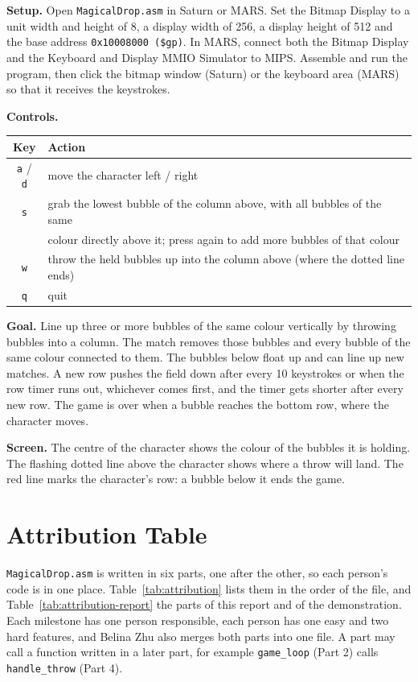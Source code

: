 \documentclass[11pt]{article}
\newcommand{\code}[1]{\texttt{#1}}
\begin{document}
\textbf{Setup.} Open \code{MagicalDrop.asm} in Saturn or MARS. Set the Bitmap
Display to a unit width and height of 8, a display width of 256, a display
height of 512 and the base address \code{0x10008000 (\$gp)}. In MARS, connect
both the Bitmap Display and the Keyboard and Display MMIO Simulator to MIPS.
Assemble and run the program, then click the bitmap window (Saturn) or the
keyboard area (MARS) so that it receives the keystrokes.

\textbf{Controls.}

\begin{center}
\begin{tabular}{@{}cl@{}}
\toprule
Key & Action\\
\midrule
\code{a} / \code{d} & move the character left / right\\
\code{s} & grab the lowest bubble of the column above, with all bubbles of the same\\
 & colour directly above it; press again to add more bubbles of that colour\\
\code{w} & throw the held bubbles up into the column above (where the dotted line ends)\\
\code{q} & quit\\
\bottomrule
\end{tabular}
\end{center}

\textbf{Goal.} Line up three or more bubbles of the same colour vertically by
throwing bubbles into a column. The match removes those bubbles and every
bubble of the same colour connected to them. The bubbles below float up and
can line up new matches. A new row pushes the field down after every 10
keystrokes or when the row timer runs out, whichever comes first, and the
timer gets shorter after every new row. The game is over when a bubble
reaches the bottom row, where the character moves.

\textbf{Screen.} The centre of the character shows the colour of the bubbles
it is holding. The flashing dotted line above the character shows where a
throw will land. The red line marks the character's row: a bubble below it
ends the game.

\section{Attribution Table}
\label{sec:attribution}

\code{MagicalDrop.asm} is written in six parts, one after the other, so each
person's code is in one place. Table~\ref{tab:attribution} lists them in the
order of the file, and Table~\ref{tab:attribution-report} the parts of this
report and of the demonstration. Each milestone has one person responsible,
each person has one easy and two hard features, and Belina Zhu also merges
both parts into one file. A part may call a function written in a later part,
for example \code{game\_loop} (Part 2) calls \code{handle\_throw} (Part 4).
\end{document}
